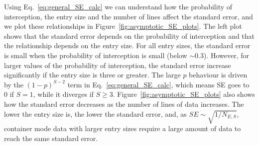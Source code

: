 \documentclass{article}
\begin{document}
Using Eq.~\eqref{eq:general_SE_calc} we can understand how the probability of interception, the entry size and the number of lines affect the standard error, and we plot these relationships in Figure~\ref{fig:asymptotic_SE_plots}. The left plot shows that the standard error depends on the probability of interception and that the relationship depends on the entry size. For all entry sizes, the standard error is small when the probability of interception is small (below \(\sim 0.3\)). However, for larger values of the probability of interception, the standard error increase significantly if the entry size is three or greater. The large \(p\) behaviour is driven by the \((1-p)^{S-2}\) term in Eq.~\eqref{eq:general_SE_calc}, which means SE goes to 0 if \(S=1\), while it diverges if \(S\geq 3\). Figure~\ref{fig:asymptotic_SE_plots} also shows how the standard error decreases as the number of lines of data increases. The lower the entry size is, the lower the standard error, and, as \(SE\sim\sqrt{1/N_{E,S}}\), container mode data with larger entry sizes require a large amount of data to reach the same standard error. 
\end{document}
